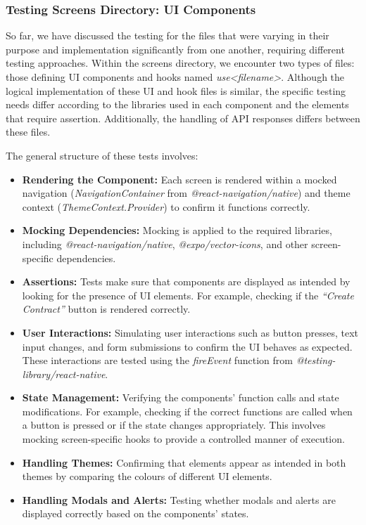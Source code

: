 \subsubsection{Testing Screens Directory: UI Components}

So far, we have discussed the testing for the files that were varying in their purpose and implementation significantly from one another, requiring different testing approaches. Within the screens directory, we encounter two types of files: those defining UI components and hooks named \textit{use<filename>}. Although the logical implementation of these UI and hook files is similar, the specific testing needs differ according to the libraries used in each component and the elements that require assertion. Additionally, the handling of API responses differs between these files.

The general structure of these tests involves:

\begin{itemize}
    \item \textbf{Rendering the Component:} Each screen is rendered within a mocked navigation (\textit{NavigationContainer} from \textit{@react-navigation/native}) and theme context (\textit{ThemeContext.Provider}) to confirm it functions correctly.
    \item \textbf{Mocking Dependencies:} Mocking is applied to the required libraries, including \textit{@react-navigation/native}, \textit{@expo/vector-icons}, and other screen-specific dependencies.
    \item \textbf{Assertions:} Tests make sure that components are displayed as intended by looking for the presence of UI elements. For example, checking if the \textit{``Create Contract''} button is rendered correctly.
    \item \textbf{User Interactions:} Simulating user interactions such as button presses, text input changes, and form submissions to confirm the UI behaves as expected. These interactions are tested using the \textit{fireEvent} function from \textit{@testing-library/react-native}.
    \item \textbf{State Management:} Verifying the components' function calls and state modifications. For example, checking if the correct functions are called when a button is pressed or if the state changes appropriately. This involves mocking screen-specific hooks to provide a controlled manner of execution.
    \item \textbf{Handling Themes:} Confirming that elements appear as intended in both themes by comparing the colours of different UI elements.
    \item \textbf{Handling Modals and Alerts:} Testing whether modals and alerts are displayed correctly based on the components' states.
\end{itemize}

